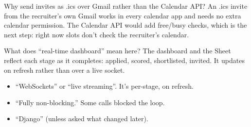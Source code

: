 \begin{iq}{Why send invites as .ics over Gmail rather than the Calendar API?}
An .ics invite from the recruiter's own Gmail works in every calendar app and needs no extra calendar permission. The Calendar API would add free/busy checks, which is the next step: right now slots don't check the recruiter's calendar.
\end{iq}

\begin{iq}{What does ``real-time dashboard'' mean here?}
The dashboard and the Sheet reflect each stage as it completes: applied, scored, shortlisted, invited. It updates on refresh rather than over a live socket.
\end{iq}

\begin{bugfix}
\begin{itemize}
  \item ``WebSockets'' or ``live streaming''. It's per-stage, on refresh.
  \item ``Fully non-blocking.'' Some calls blocked the loop.
  \item ``Django'' (unless asked what changed later).
\end{itemize}
\end{bugfix}
